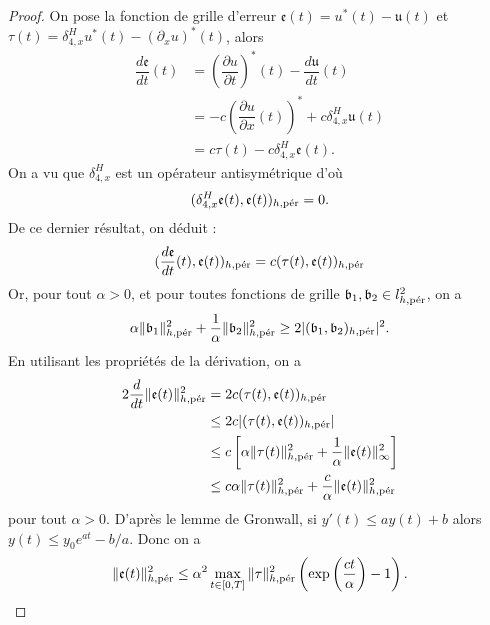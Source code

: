 \begin{proof}
On pose la fonction de grille d'erreur $\mathfrak{e}(t) = u^*(t) - \mathfrak{u}(t)$ et $\mathfrak{\tau}(t) = \delta_{4,x}^H u^*(t) - (\partial_x u)^*(t)$, alors
\begin{align*}
\dfrac{d \mathfrak{e}}{dt}(t) & = \left(\dfrac{\partial u}{\partial t}\right)^*(t) - \dfrac{d \mathfrak{u}}{dt}(t) \\
	& = - c \left( \dfrac{\partial u}{\partial x}(t) \right)^* + c \delta_{4,x}^H \mathfrak{u}(t) \\
	& = c \mathfrak{\tau}(t) - c \delta_{4,x}^H \mathfrak{e}(t).
\end{align*}
On a vu que $\delta_{4,x}^H$ est un opérateur antisymétrique d'où
\begin{equation}
( \delta_{4,x}^H \mathfrak{e}(t), \mathfrak{e}(t) )_{h,\per} = 0.
\end{equation}
De ce dernier résultat, on déduit :
\begin{equation}
( \dfrac{d \mathfrak{e}}{dt}(t) , \mathfrak{e}(t) )_{h,\per} = c ( \mathfrak{\tau}(t), \mathfrak{e}(t))_{h,\per}
\end{equation}
Or, pour tout $\alpha >0$, et pour toutes fonctions de grille $\mathfrak{b}_1,\mathfrak{b}_2   \in l^2_{h,\per}$, on a
\begin{equation}
\alpha \| \mathfrak{b}_1 \|^2_{h,\per} + \dfrac{1}{\alpha} \| \mathfrak{b}_2 \|_{h,\per}^2 \geq 2 |(\mathfrak{b}_1, \mathfrak{b}_2)_{h,\per}|^2.
\end{equation}
En utilisant les propriétés de la dérivation, on a
\begin{align*}
2\dfrac{d}{dt} \|\mathfrak{e}(t)\|_{h,\per}^2 & = 2 c ( \mathfrak{\tau}(t), \mathfrak{e}(t))_{h,\per} \\
   & \leq 2 c |( \mathfrak{\tau}(t), \mathfrak{e}(t))_{h,\per}| \\
   & \leq c \left[ \alpha \|\mathfrak{\tau}(t)\|_{h,\per}^2 + \dfrac{1}{\alpha} \|\mathfrak{e}(t)\|_{\infty}^2 \right] \\
   & \leq c \alpha \|\mathfrak{\tau}(t)\|^2_{h,\per} + \dfrac{c}{\alpha} \|\mathfrak{e}(t)\|^2_{h,\per} 
\end{align*}
pour tout $\alpha > 0$.
D'après le lemme de Gronwall, si $y'(t) \leq a y(t) + b$ alors $y(t) \leq y_0 e^{at} - b/a$. Donc on a
\begin{equation}
\|\mathfrak{e}(t)\|_{h,\per}^2 \leq \alpha^2 \max_{t \in [0,T]} \|\mathfrak{\tau}\|_{h,\per}^2   \left( \exp \left( \dfrac{ct}{\alpha} \right) -1  \right).
\end{equation}

\end{proof}
